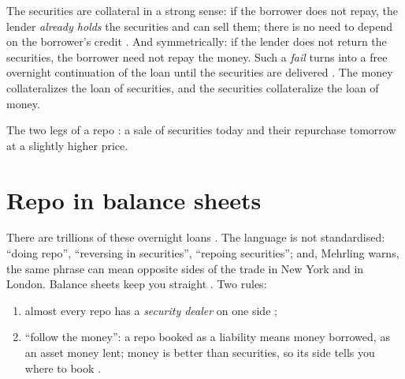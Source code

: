 \begin{paracol}{2}
The securities are collateral in a strong sense: if the borrower does not repay, the lender \emph{already holds} the securities and can sell them;
there is no need to depend on the borrower's credit . And symmetrically: if the lender does not return the securities, the
borrower need not repay the money. Such a \emph{fail} turns into a free overnight continuation of the loan until the securities are delivered
. The money collateralizes the loan of securities, and the securities collateralize the loan of money.

\begin{nfigure}
\caption{The two legs of a repo : a sale of securities today and their repurchase tomorrow at a slightly higher price.}\label{fig:rp-legs}
\end{nfigure}

\section{Repo in balance sheets}\label{sec:rp-bs}

There are trillions of these overnight loans . The language is not standardised: ``doing repo'', ``reversing in securities'', ``repoing
securities''; and, Mehrling warns, the same phrase can mean opposite sides of the trade in New York and in London. Balance sheets keep you straight .
Two rules:
\begin{enumerate}
  \item almost every repo has a \emph{security dealer} on one side ;
  \item ``follow the money'': a repo booked as a liability means money borrowed, as an asset money lent; money is better than securities, so its side tells
        you where to book .
\end{enumerate}


\end{paracol}
